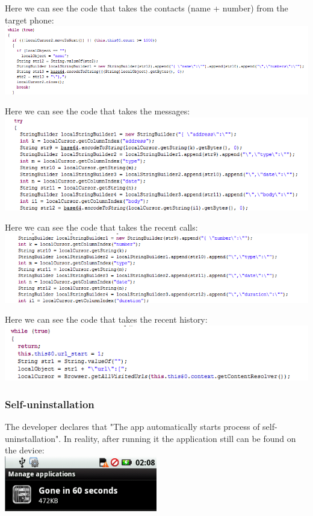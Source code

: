\parbox{\textwidth}{
Here we can see the code that takes the contacts (name + number) from the target phone: \\
\includegraphics[width=\textwidth]{figs/gone60_7.png}
}

\parbox{\textwidth}{
Here we can see the code that takes the messages: \\
\includegraphics[width=\textwidth]{figs/gone60_8.png}
}

\parbox{\textwidth}{
Here we can see the code that takes the recent calls: \\
\includegraphics[width=\textwidth]{figs/gone60_9.png}
}

\parbox{\textwidth}{
Here we can see the code that takes the recent history: \\
\includegraphics[width=\textwidth]{figs/gone60_10.png}
}

\subsubsection{Self-uninstallation}
\parbox{\textwidth}{
The developer declares that "The app automatically starts process of self-uninstallation". In reality, after running it the application still can be found on the device: \\
\includegraphics[width=0.5\textwidth]{figs/gone60_11.png}
}


